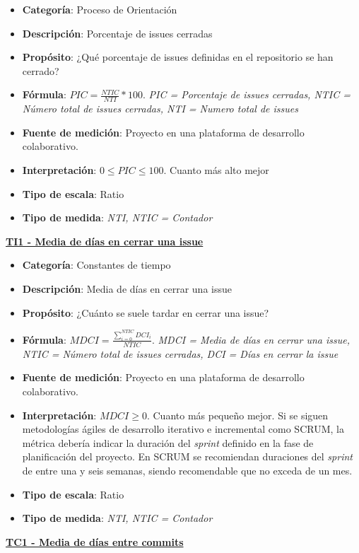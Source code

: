 \begin{itemize}
	\tightlist
	\item \textbf{Categoría}: Proceso de Orientación
	\item \textbf{Descripción}: Porcentaje de issues cerradas
	\item \textbf{Propósito}: ¿Qué porcentaje de issues definidas en el repositorio se han cerrado?
	\item \textbf{Fórmula}: $PIC = \frac{NTIC}{NTI}*100$. \textit{PIC = Porcentaje de issues cerradas, NTIC = Número total de issues cerradas, NTI = Numero total de issues}
	\item \textbf{Fuente de medición}: Proyecto en una plataforma de desarrollo colaborativo.
	\item \textbf{Interpretación}: $0 \leq PIC \leq 100$. Cuanto más alto mejor
	\item \textbf{Tipo de escala}: Ratio
	\item \textbf{Tipo de medida}: \textit{NTI, NTIC = Contador}
\end{itemize}
\textbf{\underline{TI1 - Media de días en cerrar una issue}}
\begin{itemize}
	\tightlist
	\item \textbf{Categoría}: Constantes de tiempo
	\item \textbf{Descripción}:  Media de días en cerrar una issue
	\item \textbf{Propósito}: ¿Cuánto se suele tardar en cerrar una issue? 
	\item \textbf{Fórmula}: $MDCI = \frac{\sum_{i=0}^{NTIC}DCI_i}{NTIC}$. \textit{MDCI = Media de días en cerrar una issue, NTIC = Número total de issues cerradas, DCI = Días en cerrar la issue}
	\item \textbf{Fuente de medición}: Proyecto en una plataforma de desarrollo colaborativo.
	\item \textbf{Interpretación}: $MDCI \geq 0$. Cuanto más pequeño mejor. Si se siguen metodologías ágiles de desarrollo iterativo e incremental como SCRUM, la métrica debería indicar la duración del \textit{sprint} definido en la fase de planificación del proyecto. En SCRUM se recomiendan duraciones del \textit{sprint} de entre una y seis semanas, siendo recomendable que no exceda de un mes\cite{noauthor_scrum_2019}.
	\item \textbf{Tipo de escala}: Ratio
	\item \textbf{Tipo de medida}: \textit{NTI, NTIC = Contador}
\end{itemize}
\textbf{\underline{TC1 - Media de días entre commits}}
